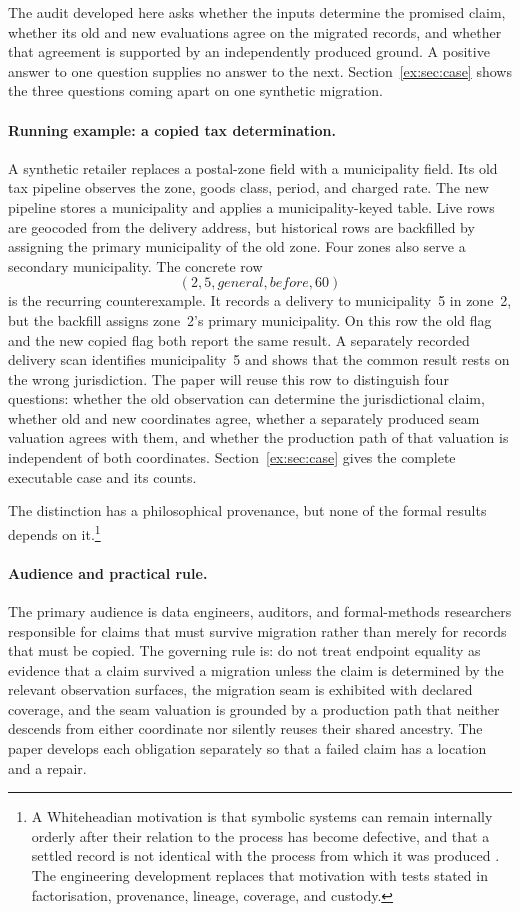 \documentclass[11pt]{article}
\theoremstyle{definition}
\begin{document}
The audit developed here asks whether the inputs determine the promised claim, whether its old and new evaluations agree on the migrated records, and whether that agreement is supported by an independently produced ground. A positive answer to one question supplies no answer to the next. Section~\ref{ex:sec:case} shows the three questions coming apart on one synthetic migration.

\paragraph{Running example: a copied tax determination.} A synthetic retailer replaces a postal-zone field with a municipality field. Its old tax pipeline observes the zone, goods class, period, and charged rate. The new pipeline stores a municipality and applies a municipality-keyed table. Live rows are geocoded from the delivery address, but historical rows are backfilled by assigning the primary municipality of the old zone. Four zones also serve a secondary municipality. The concrete row
\[
(2,5,\mathit{general},\mathit{before},60)
\]
is the recurring counterexample. It records a delivery to municipality~5 in zone~2, but the backfill assigns zone~2's primary municipality. On this row the old flag and the new copied flag both report the same result. A separately recorded delivery scan identifies municipality~5 and shows that the common result rests on the wrong jurisdiction. The paper will reuse this row to distinguish four questions: whether the old observation can determine the jurisdictional claim, whether old and new coordinates agree, whether a separately produced seam valuation agrees with them, and whether the production path of that valuation is independent of both coordinates. Section~\ref{ex:sec:case} gives the complete executable case and its counts.

The distinction has a philosophical provenance, but none of the formal results depends on it.\footnote{A Whiteheadian motivation is that symbolic systems can remain internally orderly after their relation to the process has become defective, and that a settled record is not identical with the process from which it was produced \citep{whitehead1927symbolism,whitehead1929}. The engineering development replaces that motivation with tests stated in factorisation, provenance, lineage, coverage, and custody.}

\paragraph{Audience and practical rule.} The primary audience is data engineers, auditors, and formal-methods researchers responsible for claims that must survive migration rather than merely for records that must be copied. The governing rule is: do not treat endpoint equality as evidence that a claim survived a migration unless the claim is determined by the relevant observation surfaces, the migration seam is exhibited with declared coverage, and the seam valuation is grounded by a production path that neither descends from either coordinate nor silently reuses their shared ancestry. The paper develops each obligation separately so that a failed claim has a location and a repair.
\end{document}
